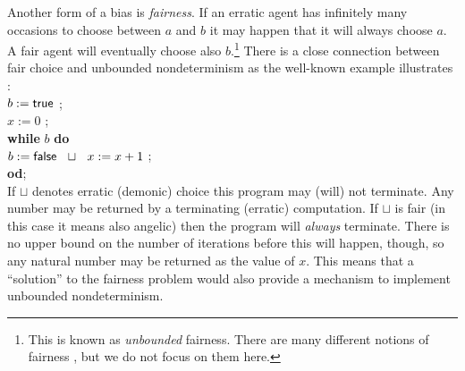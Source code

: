  Another form of a bias is {\em fairness}. If an 
erratic agent has infinitely many occasions to choose between $a$
and $b$ it may happen that it will always choose $a$. A fair 
agent will eventually choose also $b$.\footnote{ 
This is known as {\em unbounded} fairness. There 
are many different notions of fairness \cite{c:25, c:99}, but we 
do not focus on them here.}
 There is a close connection between fair choice and unbounded 
nondeterminism as the well-known example illustrates \cite{c:3, c:30, c:99}: 
\\[1ex]
\hspace*{2em} $b := {\sf true}$ ; \\
\hspace*{2em} $x := 0$ ; \\
\hspace*{2em}  {\bf while} $b$ {\bf do} \\
\hspace*{3em} $b := {\sf false}\ \ \sqcup\ \  x := x+1$ ;  \\
\hspace*{2em} {\bf od}; \\[1ex]
If $\sqcup$ denotes erratic (demonic) choice this program may (will) not 
terminate. Any number may be returned by a terminating (erratic) 
computation. If $\sqcup$ is fair (in this case it means also angelic) then 
the program will {\em always} terminate. There is no upper bound on the 
number of iterations before this will 
happen, though, so any natural number may be returned as the value of 
$x$. This means that a ``solution'' to the fairness problem would 
also provide a mechanism to implement 
unbounded nondeterminism. 

